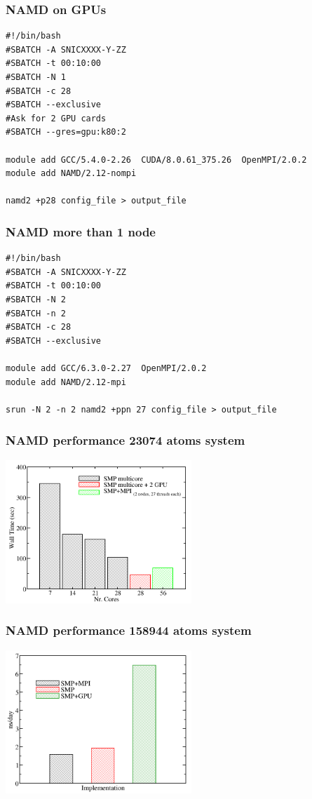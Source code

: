 \begin{frame}[fragile]
	\frametitle{NAMD on GPUs}
  
        \begin{verbatim}             
#!/bin/bash
#SBATCH -A SNICXXXX-Y-ZZ
#SBATCH -t 00:10:00
#SBATCH -N 1
#SBATCH -c 28
#SBATCH --exclusive
#Ask for 2 GPU cards
#SBATCH --gres=gpu:k80:2

module add GCC/5.4.0-2.26  CUDA/8.0.61_375.26  OpenMPI/2.0.2
module add NAMD/2.12-nompi

namd2 +p28 config_file > output_file
        \end{verbatim}

\end{frame}



\begin{frame}[fragile]
	\frametitle{NAMD more than 1 node}
  
        \begin{verbatim}             
#!/bin/bash
#SBATCH -A SNICXXXX-Y-ZZ
#SBATCH -t 00:10:00
#SBATCH -N 2
#SBATCH -n 2
#SBATCH -c 28
#SBATCH --exclusive

module add GCC/6.3.0-2.27  OpenMPI/2.0.2
module add NAMD/2.12-mpi

srun -N 2 -n 2 namd2 +ppn 27 config_file > output_file
        \end{verbatim}

\end{frame}

\begin{frame}
	\frametitle{NAMD performance 23074 atoms system}
        \begin{center}
		\includegraphics[width=7cm]{images/profiling_namd.png}
        \end{center}
\end{frame}


\begin{frame}
	\frametitle{NAMD performance 158944 atoms system}
        \begin{center}
		\includegraphics[width=7cm]{images/profiling_namd2.png}
        \end{center}
\end{frame}

